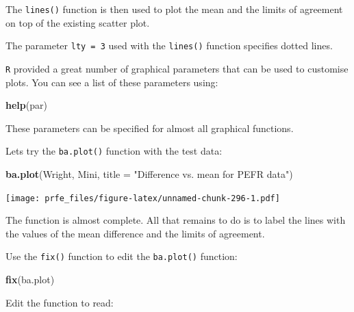 \documentclass[12pt,a4paper]{book}
\newenvironment{Shaded}{\begin{snugshade}}{\end{snugshade}}
\newcommand{\KeywordTok}[1]{\textcolor[rgb]{0.13,0.29,0.53}{\textbf{#1}}}
\newcommand{\DataTypeTok}[1]{\textcolor[rgb]{0.13,0.29,0.53}{#1}}
\newcommand{\StringTok}[1]{\textcolor[rgb]{0.31,0.60,0.02}{#1}}
\newcommand{\NormalTok}[1]{#1}
\theoremstyle{definition}
\theoremstyle{definition}
\theoremstyle{definition}
\theoremstyle{remark}
\begin{document}
The \texttt{lines()} function is then used to plot the mean and the
limits of agreement on top of the existing scatter plot.

The parameter \texttt{lty\ =\ 3} used with the \texttt{lines()} function
specifies dotted lines.

\texttt{R} provided a great number of graphical parameters that can be
used to customise plots. You can see a list of these parameters using:

\begin{Shaded}
\begin{Highlighting}[]
\KeywordTok{help}\NormalTok{(par)}
\end{Highlighting}
\end{Shaded}

These parameters can be specified for almost all graphical functions.

Lets try the \texttt{ba.plot()} function with the test data:

\begin{Shaded}
\begin{Highlighting}[]
\KeywordTok{ba.plot}\NormalTok{(Wright, Mini, }\DataTypeTok{title =}  \StringTok{"Difference vs. mean for PEFR data"}\NormalTok{)}
\end{Highlighting}
\end{Shaded}

\texttt{[image: prfe\_files/figure-latex/unnamed-chunk-296-1.pdf]}

The function is almost complete. All that remains to do is to label the
lines with the values of the mean difference and the limits of
agreement.

Use the \texttt{fix()} function to edit the \texttt{ba.plot()} function:

\begin{Shaded}
\begin{Highlighting}[]
\KeywordTok{fix}\NormalTok{(ba.plot)}
\end{Highlighting}
\end{Shaded}

Edit the function to read:
\end{document}
